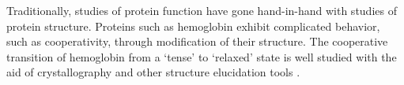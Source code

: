 \documentclass[../AdvancementSummary.tex]{subfiles}
\begin{document}
%
%
%
%
%


%
%


Traditionally, studies of protein function have gone hand-in-hand with studies of protein structure. Proteins such as hemoglobin exhibit complicated behavior, such as cooperativity, through modification of their structure. The cooperative transition of hemoglobin from a `tense' to `relaxed' state is well studied with the aid of crystallography and other structure elucidation tools \cite{Jensen1998}.
\end{document}
